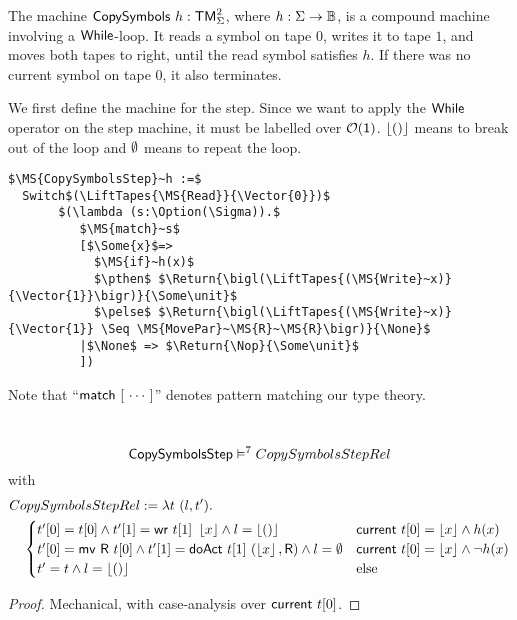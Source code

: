 The machine $\mathsf{CopySymbols}~h : \mathsf{TM}_\Sigma^2$, where $h:\Sigma\rightarrow\mathbb{B}$, is a compound machine involving a $\mathsf{While}$-loop.  It reads a symbol on tape
$0$, writes it to tape $1$, and moves both tapes to right, until the read symbol satisfies $h$.  If there was no current symbol on tape $0$, it also
terminates.

We first define the machine for the step.  Since we want to apply the $\mathsf{While}$ operator on the step machine, it must be labelled over
$\mathcal{O}(\mathsf{1})$.  $\left\lfloor {\ensuremath{\mathsf{()}}} \right\rfloor$ means to break out of the loop and $\emptyset$ means to repeat the loop.
\begin{definition}
  \label{CopySymbols_Step}
\begin{lstlisting}[style=semicoqstyle]
$\MS{CopySymbolsStep}~h :=$
  Switch$(\LiftTapes{\MS{Read}}{\Vector{0}})$
       $(\lambda (s:\Option(\Sigma)).$
          $\MS{match}~s$
          [$\Some{x}$=>
            $\MS{if}~h(x)$
            $\pthen$ $\Return{\bigl(\LiftTapes{(\MS{Write}~x)}{\Vector{1}}\bigr)}{\Some\unit}$ 
            $\pelse$ $\Return{\bigl(\LiftTapes{(\MS{Write}~x)}{\Vector{1}} \Seq \MS{MovePar}~\MS{R}~\MS{R}\bigr)}{\None}$ 
          |$\None$ => $\Return{\Nop}{\Some\unit}$ 
          ])
\end{lstlisting}
\end{definition}

Note that ``$\mathsf{match}~[~\cdots~]$'' denotes pattern matching our type theory.

\begin{lemma}
  \label{lem:CopySymbols_Step_Sem}
  ~
  \[
    \mathsf{CopySymbolsStep} \mathrel{\vDash^{7}} CopySymbolsStepRel
  \]
  with
  \small
  \begin{align*}
    &CopySymbolsStepRel := \lambda t~(l, t').~\\
    &\quad\begin{cases}
      t'[0] = t[0]           \land t'[1]=\mathsf{wr}~t[1]~\left\lfloor {x} \right\rfloor              \land l=\left\lfloor {\ensuremath{\mathsf{()}}} \right\rfloor & \mathsf{current}~t[0]=\left\lfloor {x} \right\rfloor \land       h(x) \\
      t'[0] = \mathsf{mv}~\mathsf{R}~t[0] \land t'[1]=\mathsf{doAct}~t[1]~(\left\lfloor {x} \right\rfloor, \mathsf{R}) \land l=\emptyset & \mathsf{current}~t[0]=\left\lfloor {x} \right\rfloor \land \lnot h(x) \\
      t' = t \land l=\left\lfloor {\ensuremath{\mathsf{()}}} \right\rfloor                                                                & \text{else}
    \end{cases}
  \end{align*}
\end{lemma}
\begin{proof}
  Mechanical, with case-analysis over $\mathsf{current}~t[0]$.
\end{proof}

